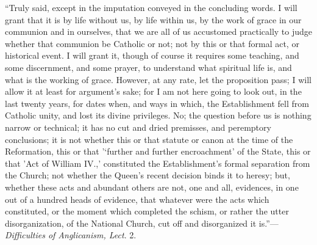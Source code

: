 ``Truly said, except in the imputation conveyed in the
concluding words. I will grant that it is by life without us, by life
within us, by the work of grace in our communion and in ourselves,
that we are all of us accustomed practically to judge whether that
communion be Catholic or not; not by this or that formal act, or
historical event. I will grant it, though of course it requires some
teaching, and some discernment, and some prayer, to understand what
spiritual life is, and what is the working of grace. However, at any
rate, let the proposition pass; I will allow it at least for argument's
sake; for I am not here going to look out, in the last twenty
years, for dates when, and ways in which, the Establishment fell from
Catholic unity, and lost its divine privileges. No; the question
before us is nothing narrow or technical; it has no cut and dried
premisses, and peremptory conclusions; it is not whether this or that
statute or canon at the time of the Reformation, this or that '‘further
and further encroachment' of the State, this or that 'Act of William
IV.,' constituted the Establishment's formal separation from the
Church; not whether the Queen's recent decision binds it to heresy;
but, whether these acts and abundant others are not, one and all,
evidences, in one out of a hundred heads of evidence, that whatever
were the acts which constituted, or the moment which completed the
schism, or rather the utter disorganization, of the National Church,
cut off and disorganized it is.''—\emph{Difficulties of
Anglicanism, Lect}.
2.

